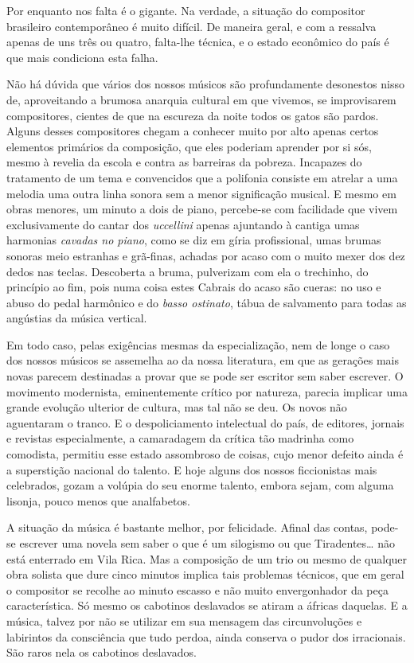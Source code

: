 Por enquanto nos falta é o gigante. Na verdade, a situação do compositor
brasileiro contemporâneo é muito difícil. De maneira geral, e com a
ressalva apenas de uns três ou quatro, falta-lhe técnica, e o estado
econômico do país é que mais condiciona esta falha.

Não há dúvida que vários dos nossos músicos são profundamente desonestos
nisso de, aproveitando a brumosa anarquia cultural em que vivemos, se
improvisarem compositores, cientes de que na escureza da noite todos os
gatos são pardos. Alguns desses compositores chegam a conhecer muito por
alto apenas certos elementos primários da composição, que eles poderiam
aprender por si sós, mesmo à revelia da escola e contra as barreiras da
pobreza. Incapazes do tratamento de um tema e convencidos que a
polifonia consiste em atrelar a uma melodia uma outra linha sonora sem a
menor significação musical. E mesmo em obras menores, um minuto a dois
de piano, percebe-se com facilidade que vivem exclusivamente do cantar
dos \textit{uccellini} apenas ajuntando à cantiga umas harmonias \textit{cavadas no
piano}, como se diz em gíria profissional, umas brumas sonoras meio
estranhas e grã-finas, achadas por acaso com o muito mexer dos dez dedos
nas teclas. Descoberta a bruma, pulverizam com ela o trechinho, do
princípio ao fim, pois numa coisa estes Cabrais do acaso são cueras: no
uso e abuso do pedal harmônico e do \textit{basso ostinato}, tábua de salvamento
para todas as angústias da música vertical.

Em todo caso, pelas exigências mesmas da especialização, nem de longe o
caso dos nossos músicos se assemelha ao da nossa literatura, em que as
gerações mais novas parecem destinadas a provar que se pode ser escritor
sem saber escrever. O movimento modernista, eminentemente crítico por
natureza, parecia implicar uma grande evolução ulterior de cultura, mas
tal não se deu. Os novos não aguentaram o tranco. E o despoliciamento
intelectual do país, de editores, jornais e revistas especialmente, a
camaradagem da crítica tão madrinha como comodista, permitiu esse estado
assombroso de coisas, cujo menor defeito ainda é a superstição nacional
do talento. E hoje alguns dos nossos ficcionistas mais celebrados, gozam
a volúpia do seu enorme talento, embora sejam, com alguma lisonja, pouco
menos que analfabetos.

A situação da música é bastante melhor, por felicidade. Afinal das
contas, pode-se escrever uma novela sem saber o que é um silogismo ou
que Tiradentes\ldots{} não está enterrado em Vila Rica. Mas a composição de
um trio ou mesmo de qualquer obra solista que dure cinco minutos implica
tais problemas técnicos, que em geral o compositor se recolhe ao minuto
escasso e não muito envergonhador da peça característica. Só mesmo os
cabotinos deslavados se atiram a áfricas daquelas. E a música, talvez
por não se utilizar em sua mensagem das circunvoluções e labirintos da
consciência que tudo perdoa, ainda conserva o pudor dos irracionais. São
raros nela os cabotinos deslavados.

